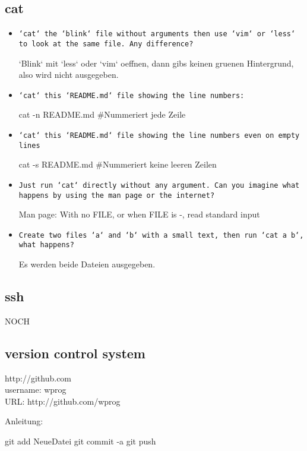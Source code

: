 \documentclass[10pt,a4paper]{scrartcl}
\begin{document}
\subsection{cat}

\begin{itemize}

\item \texttt{`cat` the `blink` file without arguments then use `vim` or `less` to look at the same file. Any difference?}


`Blink` mit `less` oder `vim` oeffnen, dann gibs keinen gruenen Hintergrund, also wird nicht ausgegeben.


\item \texttt{`cat` this `README.md` file showing the line numbers:}
\begin{terminalcode}
cat -n README.md	#Nummeriert jede Zeile
\end{terminalcode}

\item \texttt{`cat` this `README.md` file showing the line numbers even on empty lines
}

\begin{terminalcode}
cat -s README.md	#Nummeriert keine leeren Zeilen
\end{terminalcode}

\item \texttt{Just run `cat` directly without any argument. Can you imagine what happens by using the man page or the internet?}

Man page: With no FILE, or when FILE is -, read standard input

\item \texttt{Create two files `a` and `b` with a small text, then run `cat a b`, what happens?}

Es werden beide Dateien ausgegeben.
\end{itemize}
\subsection{ssh}

NOCH

\subsection{version control system}

http://github.com\\

username: wprog\\
URL:	  http://github.com/wprog

Anleitung:\\

\begin{terminalcode}
git add NeueDatei	
git commit -a
git push
\end{terminalcode}
\end{document}

